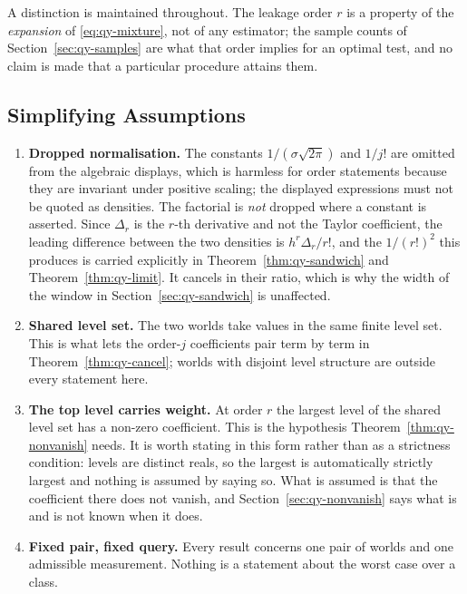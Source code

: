 \documentclass[conference]{IEEEtran}
\theoremstyle{definition}
\begin{document}
A distinction is maintained throughout. The leakage order $r$ is a property of the
\emph{expansion} of \eqref{eq:qy-mixture}, not of any estimator; the sample counts of
Section~\ref{sec:qy-samples} are what that order implies for an optimal test, and no claim is
made that a particular procedure attains them.

\subsection{Simplifying Assumptions}

\begin{enumerate}
\item[1)] \textbf{Dropped normalisation.} The constants $1/(\sigma\sqrt{2\pi})$ and $1/j!$ are
omitted from the algebraic displays, which is harmless for order statements because they are
invariant under positive scaling; the displayed expressions must not be quoted as densities.
The factorial is \emph{not} dropped where a constant is asserted. Since $\Delta_{r}$ is the
$r$-th derivative and not the Taylor coefficient, the leading difference between the two
densities is $h^{r}\Delta_{r}/r!$, and the $1/(r!)^{2}$ this produces is carried explicitly in
Theorem~\ref{thm:qy-sandwich} and Theorem~\ref{thm:qy-limit}. It cancels in their ratio, which is
why the width of the window in Section~\ref{sec:qy-sandwich} is unaffected.

\item[2)] \textbf{Shared level set.} The two worlds take values in the same finite level
set. This is what lets the order-$j$ coefficients pair term by term in
Theorem~\ref{thm:qy-cancel}; worlds with disjoint level structure are outside every statement
here.

\item[3)] \textbf{The top level carries weight.} At order $r$ the largest level of the shared
level set has a non-zero coefficient. This is the hypothesis
Theorem~\ref{thm:qy-nonvanish} needs. It is worth stating in this form rather than as a
strictness condition: levels are distinct reals, so the largest is automatically strictly
largest and nothing is assumed by saying so. What is assumed is that the coefficient there
does not vanish, and Section~\ref{sec:qy-nonvanish} says what is and is not known when it does.

\item[4)] \textbf{Fixed pair, fixed query.} Every result concerns one pair of worlds and one
admissible measurement. Nothing is a statement about the worst case over a class.
\end{enumerate}
\end{document}
